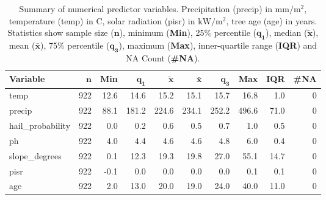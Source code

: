 \documentclass[review]{elsarticle}
\begin{document}
\begin{table}[ht]
	\centering
	\begingroup\footnotesize
	\begin{tabular}{lrrrrrrrrr}
	 \textbf{Variable} & $\mathbf{n}$ & \textbf{Min} & $\mathbf{q_1}$ & $\mathbf{\widetilde{x}}$ & $\mathbf{\bar{x}}$ & $\mathbf{q_3}$ & \textbf{Max} & \textbf{IQR} & \textbf{\#NA} \\ 
		\hline
	temp & 922 & 12.6 &  14.6 &  15.2 &  15.1 &  15.7 &  16.8 &  1.0 & 0 \\ 
		precip & 922 & 88.1 & 181.2 & 224.6 & 234.1 & 252.2 & 496.6 & 71.0 & 0 \\ 
		hail\_probability & 922 &  0.0 &   0.2 &   0.6 &   0.5 &   0.7 &   1.0 &  0.5 & 0 \\ 
		ph & 922 &  4.0 &   4.4 &   4.6 &   4.6 &   4.8 &   6.0 &  0.4 & 0 \\ 
		slope\_degrees & 922 &  0.1 &  12.3 &  19.3 &  19.8 &  27.0 &  55.1 & 14.7 & 0 \\ 
		pisr & 922 & -0.1 &   0.0 &   0.0 &   0.0 &   0.0 &   0.1 &  0.1 & 0 \\ 
		age & 922 &  2.0 &  13.0 &  20.0 &  19.0 &  24.0 &  40.0 & 11.0 & 0 \\ 
		\end{tabular}
	\endgroup
	\caption{Summary of numerical predictor variables. Precipitation (precip) in $\mathrm{mm/m^{2}}$, temperature (temp) in \degree C, solar radiation (pisr) in $\mathrm{kW/m^{2}}$, tree age (age) in years. Statistics show sample size ($\mathbf{n}$), minimum (\textbf{Min}), 25\% percentile ($\mathbf{q_1}$), median ($\mathbf{\widetilde{x}}$), mean ($\mathbf{\bar{x}}$), 75\% percentile ($\mathbf{q_3}$), maximum (\textbf{Max}), inner-quartile range (\textbf{IQR}) and NA Count (\textbf{\#NA}).}
	\label{}
	\end{table}
\end{document}
